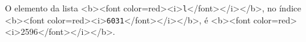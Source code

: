 \documentclass[12pt,varwidth=16cm,border=1pt]{standalone}
\begin{document}
O elemento da lista <b><font color=red><i>\verb+l+</font></i></b>, no índice <b><font color=red><i>\verb+6031+</font></i></b>, é <b><font color=red><i>2596</font></i></b>.

\questiomfalse
\end{document}

